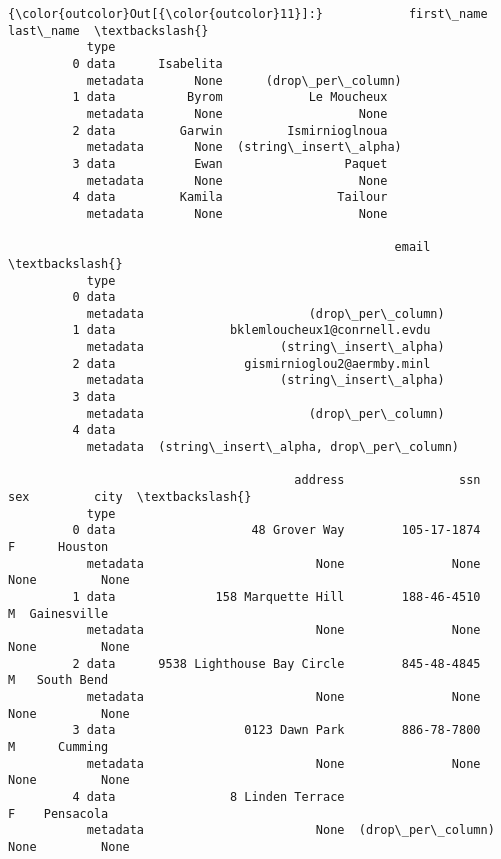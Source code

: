 \documentclass[11pt]{article}
\begin{document}
\begin{Verbatim}[commandchars=\\\{\}]
{\color{outcolor}Out[{\color{outcolor}11}]:}            first\_name              last\_name  \textbackslash{}
           type                                         
         0 data      Isabelita                          
           metadata       None      (drop\_per\_column)   
         1 data          Byrom            Le Moucheux   
           metadata       None                   None   
         2 data         Garwin         Ismirnioglnoua   
           metadata       None  (string\_insert\_alpha)   
         3 data           Ewan                 Paquet   
           metadata       None                   None   
         4 data         Kamila                Tailour   
           metadata       None                   None   
         
                                                      email  \textbackslash{}
           type                                               
         0 data                                               
           metadata                       (drop\_per\_column)   
         1 data                bklemloucheux1@conrnell.evdu   
           metadata                   (string\_insert\_alpha)   
         2 data                  gismirnioglou2@aermby.minl   
           metadata                   (string\_insert\_alpha)   
         3 data                                               
           metadata                       (drop\_per\_column)   
         4 data                                               
           metadata  (string\_insert\_alpha, drop\_per\_column)   
         
                                        address                ssn   sex         city  \textbackslash{}
           type                                                                         
         0 data                   48 Grover Way        105-17-1874     F      Houston   
           metadata                        None               None  None         None   
         1 data              158 Marquette Hill        188-46-4510     M  Gainesville   
           metadata                        None               None  None         None   
         2 data      9538 Lighthouse Bay Circle        845-48-4845     M   South Bend   
           metadata                        None               None  None         None   
         3 data                  0123 Dawn Park        886-78-7800     M      Cumming   
           metadata                        None               None  None         None   
         4 data                8 Linden Terrace                        F    Pensacola   
           metadata                        None  (drop\_per\_column)  None         None   
         

\end{Verbatim}
\end{document}
